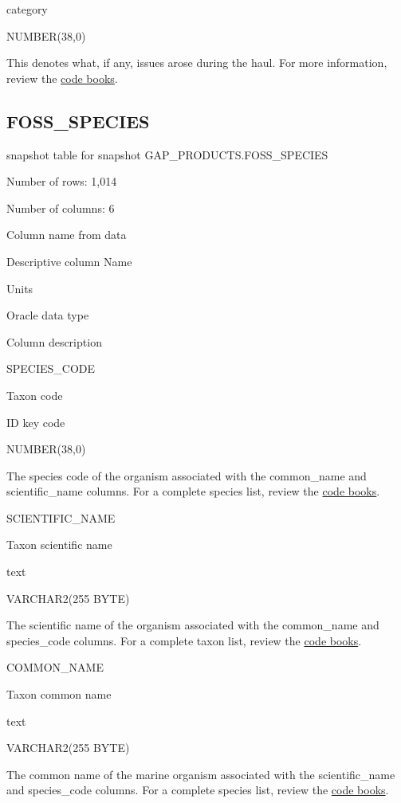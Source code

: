 \documentclass[
  letterpaper,
  oneside,
  open=any]{scrbook}
\begin{document}
category

NUMBER(38,0)

This denotes what, if any, issues arose during the haul. For more
information, review the
\href{https://www.fisheries.noaa.gov/resource/document/groundfish-survey-species-code-manual-and-data-codes-manual}{code
books}.

\subsection{FOSS\_SPECIES}\label{foss_species}

snapshot table for snapshot GAP\_PRODUCTS.FOSS\_SPECIES

Number of rows: 1,014

Number of columns: 6

Column name from data

Descriptive column Name

Units

Oracle data type

Column description

SPECIES\_CODE

Taxon code

ID key code

NUMBER(38,0)

The species code of the organism associated with the common\_name and
scientific\_name columns. For a complete species list, review the
\href{https://www.fisheries.noaa.gov/resource/document/groundfish-survey-species-code-manual-and-data-codes-manual}{code
books}.

SCIENTIFIC\_NAME

Taxon scientific name

text

VARCHAR2(255 BYTE)

The scientific name of the organism associated with the common\_name and
species\_code columns. For a complete taxon list, review the
\href{https://www.fisheries.noaa.gov/resource/document/groundfish-survey-species-code-manual-and-data-codes-manual}{code
books}.

COMMON\_NAME

Taxon common name

text

VARCHAR2(255 BYTE)

The common name of the marine organism associated with the
scientific\_name and species\_code columns. For a complete species list,
review the
\href{https://www.fisheries.noaa.gov/resource/document/groundfish-survey-species-code-manual-and-data-codes-manual}{code
books}.
\end{document}
